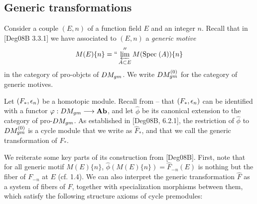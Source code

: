 \subsection{Generic transformations} Consider a couple $(E, n)$
of a function field $E$ and an integer $n$. Recall that in 
[Deg08B 3.3.1] we have associated to $(E, n)$ a \emph{generic 
motive}
\[
M(E)\{n\} = ``\varprojlim_{A \subset E}'' M(\mathrm{Spec}\;(A))\{n\}
\]
in the category of pro-objcts of $DM_{gm}$. We write 
$DM_{gm}^{(0)}$ for the category of generic motives.

Let $(F_*, \epsilon_n)$ be a homotopic module. Recall from -- that
$(F_*, \epsilon_n)$ can be identified with a functor $\varphi: DM_{gm}
\longrightarrow \mathbf{Ab}$, and let $\widehat{\phi}$ be its canonical extension to
the category of pro-$DM_{gm}$. As established in [Deg08B, 6.2.1],
the restriction of $\widehat{\phi}$ to $DM_{gm}^{(0)}$ is a cycle module
that we write as $\widehat{F}_*$, and that we call the generic
transformation of $F_*$.

We reiterate some key parts of its construction from [Deg08B]. 
First, note that for all generic motif $M(E)\{n\}$, 
$\widehat{\phi}(M(E)\{n\}) = \widehat{F}_{-n}(E)$ is nothing
but the fiber of $F_{-n}$ at $E$ (cf. 1.4). We can also interpret
the generic transformation $\widehat{F}$ as a system of fibers 
of $F$, together with specialization morphisms between them,
which satisfy the following structure axioms of cycle premodules:

